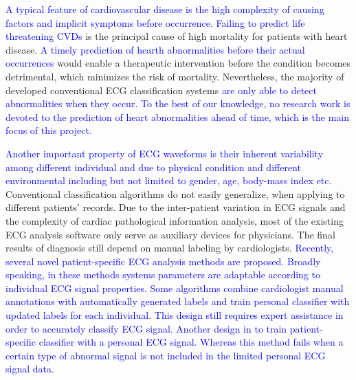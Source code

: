 \textcolor{blue}{A typical feature of cardiovascular disease is the high complexity of causing factors and implicit symptoms before occurrence\cite{wilson1998prediction, whooley2008depressive}. Failing to predict life threatening CVDs} %
is the principal cause of high mortality for patients with heart disease. 
\textcolor{blue}{A timely prediction of hearth abnormalities before their actual occurrences }%
would enable a therapeutic intervention %
before the condition becomes detrimental, which minimizes the risk of mortality. Nevertheless, the majority of developed conventional ECG classification systems  \textcolor{blue}{are only able to detect abnormalities when they occur. To the best of our knowledge, no research work is devoted to the prediction of heart abnormalities ahead of time, which is the main focus of this project\cite{jambukia2015classification, advancewarning}.} %

\textcolor{blue}{Another important property of ECG waveforms is their inherent variability among different individual and due to physical condition and different environmental including but not limited to gender, age, body-mass index etc\cite{agesex,intervaria}.}
Conventional classification algorithms do not easily generalize, when %
applying to different patients' records\cite{llamedo2012automatic}. 
Due to the inter-patient variation in ECG signals and the complexity of cardiac pathological information analysis, most of the existing ECG analysis software only serve as auxiliary devices for physicians. The final results of diagnosis still depend on manual labeling by cardiologists. \textcolor{blue}{Recently, several novel patient-specific ECG analysis methods are proposed. Broadly speaking, in these methods systems parameters are adaptable according to individual ECG signal properties. Some algorithms combine cardiologist manual annotations with automatically generated labels and train personal classifier with updated labels for each individual. This design still requires expert assistance in order to accurately classify ECG signal. Another design in to train patient-specific classifier with a personal ECG signal. Whereas this method fails when a certain type of abnormal signal is not included in the limited personal ECG signal data.}%


